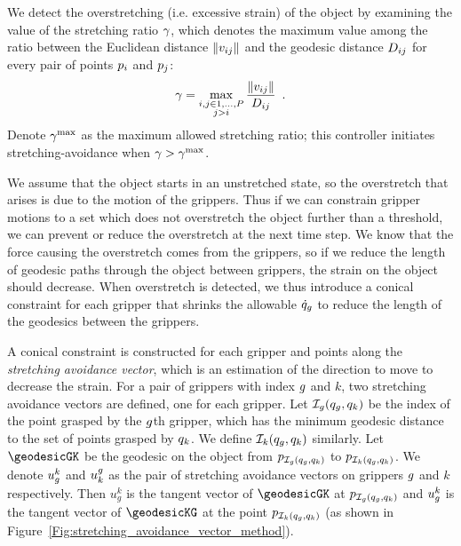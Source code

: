 We detect the overstretching (i.e. excessive strain) of the object by examining the value of the stretching ratio $\gamma$, which denotes the maximum value among the ratio between the Euclidean distance $\| v_{i j} \|$ and the geodesic distance $D_{i j}$ for every pair of points $p_i$ and $p_j$:
\begin{equation}
    \gamma = \max_{\substack{i, j \in 1, \dots, P \\ j > i}} \frac{\| v_{i j} \|}{D_{i j}} \enspace .
    \label{Eq:Method_stretching_detection}
\end{equation}
Denote $\gamma^{\textrm{max}}$ as the maximum allowed stretching ratio; this controller initiates stretching-avoidance when $\gamma > \gamma^{\textrm{max}}$.

We assume that the object starts in an unstretched state, so the overstretch that arises is due to the motion of the grippers. Thus if we can constrain gripper motions to a set which does not overstretch the object further than a threshold, we can prevent or reduce the overstretch at the next time step. We know that the force causing the overstretch comes from the grippers, so if we reduce the length of geodesic paths through the object between grippers, the strain on the object should decrease. When overstretch is detected, we thus introduce a conical constraint for each gripper that shrinks the allowable $\dot{q}_g$ to reduce the length of the geodesics between the grippers. 

A conical constraint is constructed for each gripper and points along the \textit{stretching avoidance vector}, which is an estimation of the direction to move to decrease the strain. For a pair of grippers with index $g$ and $k$, two stretching avoidance vectors are defined, one for each gripper. Let $\mathcal{I}_g(q_g, q_k)$ be the index of the point grasped by the $g$th gripper, which has the minimum geodesic distance to the set of points grasped by $q_k$. We define $\mathcal{I}_k(q_g, q_k)$ similarly.  Let $\geodesicGK$ be the geodesic on the object from $p_{\mathcal{I}_g(q_g, q_k)}$ to $p_{\mathcal{I}_k(q_g, q_k)}$. We denote $u_g^k$ and $u_k^g$ as the pair of stretching avoidance vectors on grippers $g$ and $k$ respectively.  Then $u^k_g$ is the tangent vector of $\geodesicGK$ at $p_{\mathcal{I}_g(q_g, q_k)}$ and $u_g^k$ is the tangent vector of $\geodesicKG$ at the point $p_{\mathcal{I}_k(q_g, q_k)}$ (as shown in Figure~\ref{Fig:stretching_avoidance_vector_method}). 

